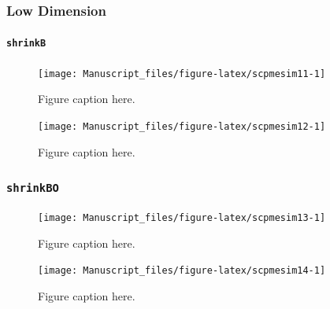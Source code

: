 \documentclass[11pt,]{report}
\let\oldparagraph\paragraph
\renewcommand{\paragraph}[1]{\oldparagraph{#1}\mbox{}}
\begin{document}
\hypertarget{low-dimension-1}{%
\subsubsection{Low Dimension}\label{low-dimension-1}}

\hypertarget{shrinkb-1}{%
\paragraph{\texorpdfstring{\texttt{shrinkB}}{shrinkB}}\label{shrinkb-1}}

\vspace{1cm}

\begin{figure}

{\centering \texttt{[image: Manuscript\_files/figure-latex/scpmesim11-1]} 

}

\caption{Figure caption here.}\label{fig:scpmesim11}
\end{figure}

\vspace{1cm}

\begin{figure}

{\centering \texttt{[image: Manuscript\_files/figure-latex/scpmesim12-1]} 

}

\caption{Figure caption here.}\label{fig:scpmesim12}
\end{figure}

\hypertarget{shrinkbo-1}{%
\subsubsection{\texorpdfstring{\texttt{shrinkBO}}{shrinkBO}}\label{shrinkbo-1}}

\vspace{1cm}

\begin{figure}

{\centering \texttt{[image: Manuscript\_files/figure-latex/scpmesim13-1]} 

}

\caption{Figure caption here.}\label{fig:scpmesim13}
\end{figure}

\vspace{1cm}

\begin{figure}

{\centering \texttt{[image: Manuscript\_files/figure-latex/scpmesim14-1]} 

}

\caption{Figure caption here.}\label{fig:scpmesim14}
\end{figure}
\end{document}
